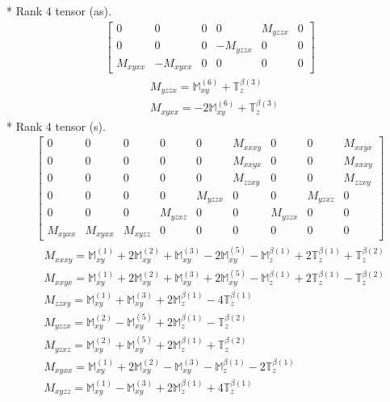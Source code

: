 \documentclass[fleqn,8pt,landscape]{jsarticle}
\begin{document}
* Rank 4 tensor (as).
\begin{align*}
\begin{bmatrix} 0 & 0 & 0 & 0 & M_{yzzx} & 0 \\ 0 & 0 & 0 & - M_{yzzx} & 0 & 0 \\ M_{xyxx} & - M_{xyxx} & 0 & 0 & 0 & 0 \end{bmatrix}
\end{align*}
\begin{align*}
& M_{yzzx} = \mathbb{M}_{xy}^{(6)} + \mathbb{T}_{z}^{\beta(3)} \\
& M_{xyxx} = - 2 \mathbb{M}_{xy}^{(6)} + \mathbb{T}_{z}^{\beta(3)}
\end{align*}
* Rank 4 tensor (s).
\begin{align*}
\begin{bmatrix} 0 & 0 & 0 & 0 & 0 & M_{xxxy} & 0 & 0 & M_{xxyx} \\ 0 & 0 & 0 & 0 & 0 & M_{xxyx} & 0 & 0 & M_{xxxy} \\ 0 & 0 & 0 & 0 & 0 & M_{zzxy} & 0 & 0 & M_{zzxy} \\ 0 & 0 & 0 & 0 & M_{yzzx} & 0 & 0 & M_{yzxz} & 0 \\ 0 & 0 & 0 & M_{yzxz} & 0 & 0 & M_{yzzx} & 0 & 0 \\ M_{xyxx} & M_{xyxx} & M_{xyzz} & 0 & 0 & 0 & 0 & 0 & 0 \end{bmatrix}
\end{align*}
\begin{align*}
& M_{xxxy} = \mathbb{M}_{xy}^{(1)} + 2 \mathbb{M}_{xy}^{(2)} + \mathbb{M}_{xy}^{(3)} - 2 \mathbb{M}_{xy}^{(5)} - \mathbb{M}_{z}^{\beta(1)} + 2 \mathbb{T}_{z}^{\beta(1)} + \mathbb{T}_{z}^{\beta(2)} \\
& M_{xxyx} = \mathbb{M}_{xy}^{(1)} + 2 \mathbb{M}_{xy}^{(2)} + \mathbb{M}_{xy}^{(3)} + 2 \mathbb{M}_{xy}^{(5)} - \mathbb{M}_{z}^{\beta(1)} + 2 \mathbb{T}_{z}^{\beta(1)} - \mathbb{T}_{z}^{\beta(2)} \\
& M_{zzxy} = \mathbb{M}_{xy}^{(1)} + \mathbb{M}_{xy}^{(3)} + 2 \mathbb{M}_{z}^{\beta(1)} - 4 \mathbb{T}_{z}^{\beta(1)} \\
& M_{yzzx} = \mathbb{M}_{xy}^{(2)} - \mathbb{M}_{xy}^{(5)} + 2 \mathbb{M}_{z}^{\beta(1)} - \mathbb{T}_{z}^{\beta(2)} \\
& M_{yzxz} = \mathbb{M}_{xy}^{(2)} + \mathbb{M}_{xy}^{(5)} + 2 \mathbb{M}_{z}^{\beta(1)} + \mathbb{T}_{z}^{\beta(2)} \\
& M_{xyxx} = \mathbb{M}_{xy}^{(1)} + 2 \mathbb{M}_{xy}^{(2)} - \mathbb{M}_{xy}^{(3)} - \mathbb{M}_{z}^{\beta(1)} - 2 \mathbb{T}_{z}^{\beta(1)} \\
& M_{xyzz} = \mathbb{M}_{xy}^{(1)} - \mathbb{M}_{xy}^{(3)} + 2 \mathbb{M}_{z}^{\beta(1)} + 4 \mathbb{T}_{z}^{\beta(1)}
\end{align*}
\end{document}
